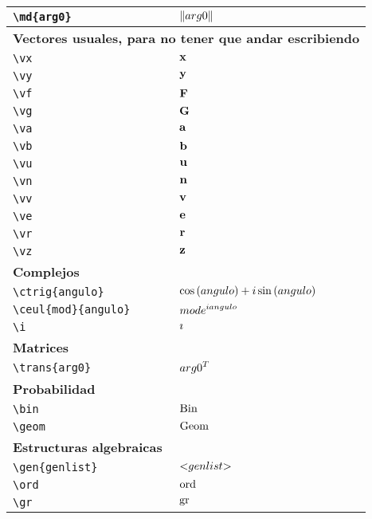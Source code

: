 \begin{longtable}{|p{3.5cm}|p{2cm}|}
\verb|\md{arg0}| & $\displaystyle\| arg0 \|$ \\ \midrule 
\bottomrule \multicolumn{2}{|p{5.5cm}|}{\textbf{Vectores usuales, para no tener que andar escribiendo}} \\ \toprule 
\verb|\vx| & $\displaystyle\bold{x}$ \\ \midrule 
\verb|\vy| & $\displaystyle\bold{y}$ \\ \midrule 
\verb|\vf| & $\displaystyle\bold{F}$ \\ \midrule 
\verb|\vg| & $\displaystyle\bold{G}$ \\ \midrule 
\verb|\va| & $\displaystyle\bold{a}$ \\ \midrule 
\verb|\vb| & $\displaystyle\bold{b}$ \\ \midrule 
\verb|\vu| & $\displaystyle\bold{u}$ \\ \midrule 
\verb|\vn| & $\displaystyle\bold{n}$ \\ \midrule 
\verb|\vv| & $\displaystyle\bold{v}$ \\ \midrule 
\verb|\ve| & $\displaystyle\bold{e}$ \\ \midrule 
\verb|\vr| & $\displaystyle\bold{r}$ \\ \midrule 
\verb|\vz| & $\displaystyle\bold{z}$ \\ \midrule 
\bottomrule \multicolumn{2}{|p{5.5cm}|}{\textbf{Complejos}} \\ \toprule 
\verb|\ctrig{angulo}| & $\displaystyle\cos \left(angulo\right) + i \sin \left(angulo\right)$ \\ \midrule 
\verb|\ceul{mod}{angulo}| & $\displaystyle mod e^{i angulo}$ \\ \midrule 
\verb|\i| & $\displaystyle\imath$ \\ \midrule 
\bottomrule \multicolumn{2}{|p{5.5cm}|}{\textbf{Matrices}} \\ \toprule 
\verb|\trans{arg0}| & $\displaystyle{arg0}^{T}$ \\ \midrule 
\bottomrule \multicolumn{2}{|p{5.5cm}|}{\textbf{Probabilidad}} \\ \toprule 
\verb|\bin| & $\displaystyle\operatorname{Bin}$ \\ \midrule 
\verb|\geom| & $\displaystyle\operatorname{Geom}$ \\ \midrule 
\bottomrule \multicolumn{2}{|p{5.5cm}|}{\textbf{Estructuras algebraicas}} \\ \toprule 
\verb|\gen{genlist}| & $\displaystyle\mathopen{<} genlist \mathclose{>}$ \\ \midrule 
\verb|\ord| & $\displaystyle\operatorname{ord}$ \\ \midrule 
\verb|\gr| & $\displaystyle\operatorname{gr}$ \\ \midrule 

\end{longtable}
